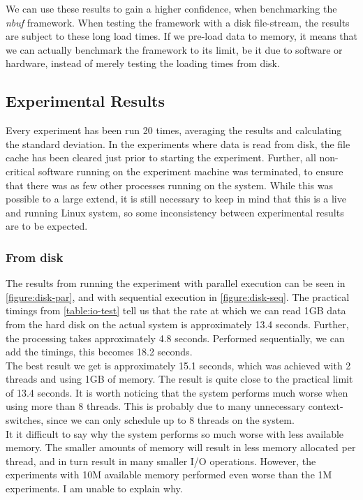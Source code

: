 \documentclass[a4paper]{article}
\newcommand{\nbuf}{\textit{nbuf} }
\begin{document}
We can use these results to gain a higher confidence, when benchmarking the \nbuf framework. When testing the framework with a disk file-stream, the results are subject to these long load times. If we pre-load data to memory, it means that we can actually benchmark the framework to its limit, be it due to software or hardware, instead of merely testing the loading times from disk.


\subsection{Experimental Results}
Every experiment has been run 20 times, averaging the results and calculating the standard deviation. In the experiments where data is read from disk, the file cache has been cleared just prior to starting the experiment. Further, all non-critical software running on the experiment machine was terminated, to ensure that there was as few other processes running on the system. While this was possible to a large extend, it is still necessary to keep in mind that this is a live and running Linux system, so some inconsistency between experimental results are to be expected.


\subsubsection{From disk}
The results from running the experiment with parallel execution can be seen in \autoref{figure:disk-par}, and with sequential execution in \autoref{figure:disk-seq}. The practical timings from \autoref{table:io-test} tell us that the rate at which we can read 1GB data from the hard disk on the actual system is approximately 13.4 seconds. Further, the processing takes approximately 4.8 seconds. Performed sequentially, we can add the timings, this becomes 18.2 seconds.\\

The best result we get is approximately 15.1 seconds, which was achieved with 2 threads and using 1GB of memory. The result is quite close to the practical limit of 13.4 seconds. It is worth noticing that the system performs much worse when using more than 8 threads. This is probably due to many unnecessary context-switches, since we can only schedule up to 8 threads on the system.\\

It it difficult to say why the system performs so much worse with less available memory. The smaller amounts of memory will result in less memory allocated per thread, and in turn result in many smaller I/O operations. However, the experiments with 10M available memory performed even worse than the 1M experiments. I am unable to explain why.\\
\end{document}
